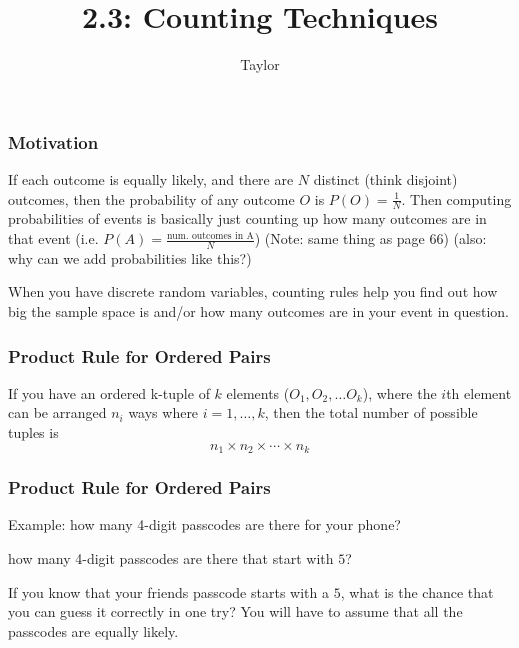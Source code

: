 \documentclass{beamer}
\title["2.3"]{2.3: Counting Techniques}
\author{Taylor}
\institute[UVA] 
{
University of Virginia \\
\medskip
\textit{} 
}
\date{}
\begin{document}

\begin{frame}
\titlepage 
\end{frame}

\begin{frame}
\frametitle{Motivation}

If each outcome is equally likely, and there are $N$ distinct (think disjoint) outcomes, then the probability of any outcome $O$ is $P(O) = \frac{1}{N}$. Then computing probabilities of events is basically just counting up how many outcomes are in that event (i.e. $P(A) = \frac{\text{num. outcomes in A}}{N}$) (Note: same thing as page 66) (also: why can we add probabilities like this?)
\newline

When you have discrete random variables, counting rules help you find out how big the sample space is and/or how many outcomes are in your event in question.

\end{frame}


\begin{frame}
\frametitle{Product Rule for Ordered Pairs}

If you have an ordered k-tuple of $k$ elements ($O_1, O_2, \ldots O_k$), where the $i$th element can be arranged $n_i$ ways where $i = 1, \ldots, k$, then the total number of possible tuples is 
\[
n_1 \times n_2 \times \cdots \times n_k
\]


\end{frame}



\begin{frame}
\frametitle{Product Rule for Ordered Pairs}

Example: 
how many 4-digit passcodes are there for your phone?
\newline

how many 4-digit passcodes are there that start with $5$?
\newline

If you know that your friends passcode starts with a $5$, what is the chance that you can guess it correctly in one try?  You will have to assume that all the passcodes are equally likely.
\end{frame}
\end{document}
